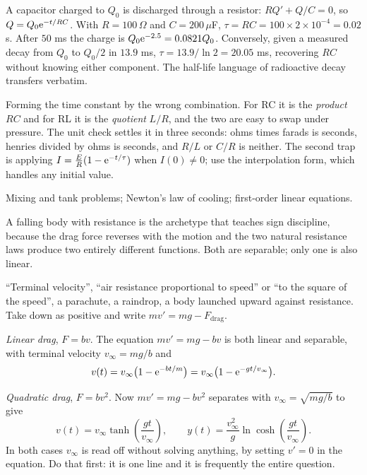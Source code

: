 \begin{worked}
A capacitor charged to $Q_0$ is discharged through a resistor: $RQ'+Q/C=0$, so $Q=Q_0\mathrm{e}^{-t/RC}$. With $R=100\,\Omega$ and $C=200\,\mu$F, $\tau=RC=100\times2\times10^{-4}=0.02$ s. After $50$ ms the charge is $Q_0\mathrm{e}^{-2.5}=0.0821Q_0$. Conversely, given a measured decay from $Q_0$ to $Q_0/2$ in $13.9$ ms, $\tau=13.9/\ln2=20.05$ ms, recovering $RC$ without knowing either component. The half-life language of radioactive decay transfers verbatim.
\end{worked}

\begin{trap}
Forming the time constant by the wrong combination. For RC it is the \emph{product} $RC$ and for RL it is the \emph{quotient} $L/R$, and the two are easy to swap under pressure. The unit check settles it in three seconds: ohms times farads is seconds, henries divided by ohms is seconds, and $R/L$ or $C/R$ is neither. The second trap is applying $I=\frac ER(1-\mathrm{e}^{-t/\tau})$ when $I(0)\ne0$; use the interpolation form, which handles any initial value.
\end{trap}

\begin{seealsob}Mixing and tank problems; Newton's law of cooling; first-order linear equations.\end{seealsob}

A falling body with resistance is the archetype that teaches sign discipline, because the drag force reverses with the motion and the two natural resistance laws produce two entirely different functions. Both are separable; only one is also linear.

\cue ``Terminal velocity'', ``air resistance proportional to speed'' or ``to the square of the speed'', a parachute, a raindrop, a body launched upward against resistance.
\method Take down as positive and write $m v'=mg-F_{\text{drag}}$.

\emph{Linear drag}, $F=bv$. The equation $mv'=mg-bv$ is both linear and separable, with terminal velocity $v_\infty=mg/b$ and
\[v(t)=v_\infty\bigl(1-\mathrm{e}^{-bt/m}\bigr)=v_\infty\bigl(1-\mathrm{e}^{-gt/v_\infty}\bigr).\]

\emph{Quadratic drag}, $F=bv^{2}$. Now $mv'=mg-bv^{2}$ separates with $v_\infty=\sqrt{mg/b}$ to give
\[v(t)=v_\infty\tanh\!\left(\frac{gt}{v_\infty}\right),\qquad y(t)=\frac{v_\infty^{2}}{g}\ln\cosh\!\left(\frac{gt}{v_\infty}\right).\]
In both cases $v_\infty$ is read off without solving anything, by setting $v'=0$ in the equation. Do that first: it is one line and it is frequently the entire question.


